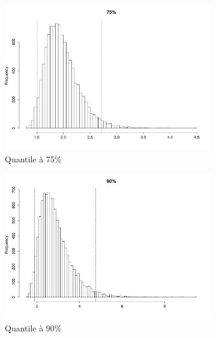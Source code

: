 \documentclass{article}
\renewcommand*{\(}{ \left( }
\renewcommand*{\)}{ \right) }
\begin{document}
\begin{figure}[H]
    \centering
    \begin{subfigure}[t]{0.3\textwidth}
        \includegraphics[width = \linewidth]{img/BootstrapParamHill-75-100.pdf}
        \caption{Quantile à 75\%}
        \label{fig:BPH75} %
    \end{subfigure}%
    \begin{subfigure}[t]{0.3\textwidth}
        \includegraphics[width = \linewidth]{img/BootstrapParamHill-90-100.pdf}
        \caption{Quantile à 90\%}
        \label{fig:BPH90}
    \end{subfigure}%
    \begin{subfigure}[t]{0.3\textwidth}

\end{subfigure}
\end{figure}
\end{document}
